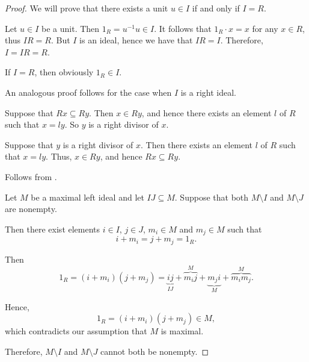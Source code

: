\begin{proof}
   We will prove that there exists a unit \( u \in I \) if and only if \( I = R \).

  \SufficiencySubProof* Let \( u \in I \) be a unit. Then \( 1_R = u^{-1} u \in I \). It follows that \( 1_R \cdot x = x \) for any \( x \in R \), thus \( IR = R \). But \( I \) is an ideal, hence we have that \( IR = I \). Therefore, \( I = IR = R \).

  \NecessitySubProof* If \( I = R \), then obviously \( 1_R \in I \).

  An analogous proof follows for the case when \( I \) is a right ideal.


  \SufficiencySubProof* Suppose that \( Rx \subseteq Ry \). Then \( x \in Ry \), and hence there exists an element \( l \) of \( R \) such that \( x = ly \). So \( y \) is a right divisor of \( x \).

  \NecessitySubProof* Suppose that \( y \) is a right divisor of \( x \). Then there exists an element \( l \) of \( R \) such that \( x = ly \). Thus, \( x \in Ry \), and hence \( Rx \subseteq Ry \).

   Follows from .

   Let \( M \) be a maximal left ideal and let \( IJ \subseteq M \). Suppose that both \( M \setminus I \) and \( M \setminus J \) are nonempty.

  Then there exist elements \( i \in I \), \( j \in J \), \( m_i \in M \) and \( m_j \in M \) such that
  \begin{equation*}
    i + m_i = j + m_j = 1_R.
  \end{equation*}

  Then
  \begin{equation*}
    1_R = (i + m_i) (j + m_j) = \underbrace{ij}_{IJ} + \overbrace{m_i j}^M + \underbrace{m_j i}_M + \overbrace{m_i m_j}^M.
  \end{equation*}

  Hence,
  \begin{equation*}
    1_R = (i + m_i) (j + m_j) \in M,
  \end{equation*}
  which contradicts our assumption that \( M \) is maximal.

  Therefore, \( M \setminus I \) and \( M \setminus J \) cannot both be nonempty.


\end{proof}
